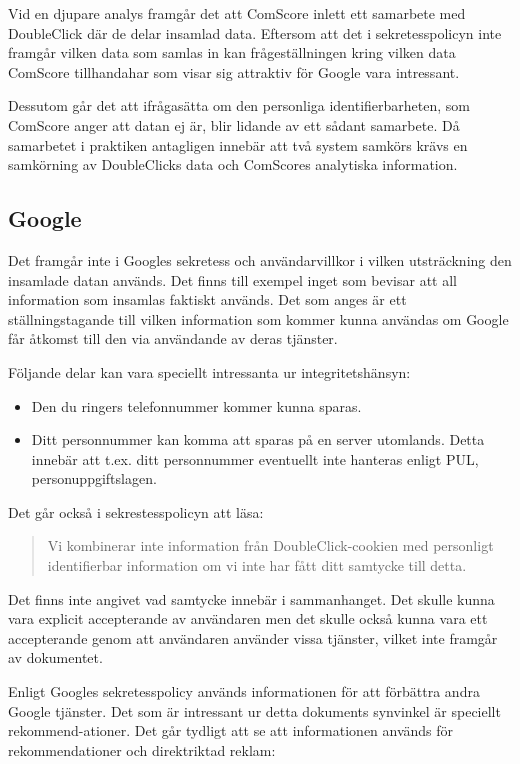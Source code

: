 \documentclass[a4paper,11pt]{article}
\begin{document}
{Vid en djupare analys framgår det att ComScore inlett ett samarbete med DoubleClick där de delar insamlad data. Eftersom att det i sekretesspolicyn inte framgår vilken data som samlas in kan frågeställningen kring vilken data ComScore tillhandahar som visar sig attraktiv för Google vara intressant.

Dessutom går det att ifrågasätta om den personliga identifierbarheten, som ComScore anger att datan ej är, blir lidande av ett sådant samarbete. Då samarbetet i praktiken antagligen innebär att två system samkörs krävs en samkörning av DoubleClicks data och ComScores analytiska information.

\subsection{Google}
Det framgår inte i Googles sekretess och användarvillkor \cite{GooglePrivacyPolicy} i vilken utsträckning den insamlade datan används. Det finns till exempel inget som bevisar att all information som insamlas faktiskt används. Det som anges är ett ställningstagande till vilken information som kommer kunna användas om Google får åtkomst till den via användande av deras tjänster.  

Följande delar kan vara speciellt intressanta ur integritetshänsyn: 

\begin{itemize}
	\item Den du ringers telefonnummer kommer kunna sparas. 
	\item Ditt personnummer kan komma att sparas på en server utomlands. Detta innebär att t.ex. ditt personnummer eventuellt inte hanteras enligt PUL, personuppgiftslagen.
\end{itemize}

Det går också i sekrestesspolicyn att läsa: 

\begin{quote}
Vi kombinerar inte information från DoubleClick-cookien med personligt identifierbar information om vi inte har fått ditt samtycke till detta.
\end{quote}

Det finns inte angivet vad samtycke innebär i sammanhanget. Det skulle kunna vara explicit accepterande av användaren men det skulle också kunna vara ett accepterande genom att användaren använder vissa tjänster, vilket inte framgår av dokumentet. 

Enligt Googles sekretesspolicy \cite{GooglePrivacyPolicy} används informationen för att förbättra andra Google tjänster. Det som är intressant ur detta dokuments synvinkel är speciellt rekommend-ationer. Det går tydligt att se att informationen används för rekommendationer och direktriktad reklam: 

}
\end{document}
